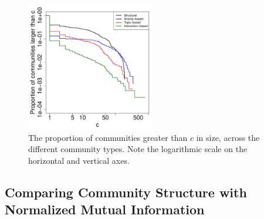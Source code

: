 \begin{figure}[ht]
  \centering
\includegraphics[width=0.50\textwidth]{comm_sizes_ecdf_loglog.pdf}
\caption{The proportion of communities greater than $c$ in size, across the different community types. Note the logarithmic scale on the horizontal and vertical axes.}
\label{Fig-community_size_distribution}
\end{figure}




\subsection{Comparing Community Structure with Normalized Mutual Information}

